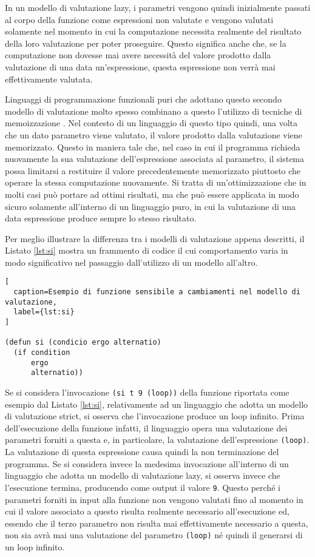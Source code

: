 In un modello di valutazione lazy, i parametri vengono quindi inizialmente
passati al corpo della funzione come espressioni non valutate e vengono valutati
solamente nel momento in cui la computazione necessita realmente del risultato
della loro valutazione per poter proseguire. Questo significa anche che, se la
computazione non dovesse mai avere necessità del valore prodotto dalla
valutazione di una data un'espressione, questa espressione non verrà mai
effettivamente valutata.

Linguaggi di programmazione funzionali puri che adottano questo secondo modello
di valutazione molto spesso combinano a questo l'utilizzo di tecniche di
memoizzazione \cite{Geyer-Schulz:1989:MEM:379209.379211}. Nel contesto di un
linguaggio di questo tipo quindi, una volta che un dato parametro viene
valutato, il valore prodotto dalla valutazione viene memorizzato. Questo in
maniera tale che, nel caso in cui il programma richieda nuovamente la sua
valutazione dell'espressione associata al parametro, il sistema possa limitarsi
a restituire il valore precedentemente memorizzato piuttosto che operare la
stessa computazione nuovamente. Si tratta di un'ottimizzazione che in molti casi
può portare ad ottimi risultati, ma che può essere applicata in modo sicuro
solamente all'interno di un linguaggio puro, in cui la valutazione di una data
espressione produce sempre lo stesso risultato.

Per meglio illustrare la differenza tra i modelli di valutazione appena
descritti, il Listato \ref{lst:si} mostra un frammento di codice il cui
comportamento varia in modo significativo nel passaggio dall'utilizzo di un
modello all'altro.

\begin{lstlisting}[
  caption=Esempio di funzione sensibile a cambiamenti nel modello di valutazione,
  label={lst:si}
]

(defun si (condicio ergo alternatio)
  (if condition
      ergo
      alternatio))

\end{lstlisting}

Se si considera l'invocazione \texttt{(si t 9 (loop))} della funzione riportata
come esempio dal Listato \ref{lst:si}, relativamente ad un linguaggio che adotta
un modello di valutazione strict, si osserva che l'invocazione produce un loop
infinito. Prima dell'esecuzione della funzione infatti, il linguaggio opera una
valutazione dei parametri forniti a questa e, in particolare, la valutazione
dell'espressione \texttt{(loop)}. La valutazione di questa espressione causa
quindi la non terminazione del programma. Se si considera invece la medesima
invocazione all'interno di un linguaggio che adotta un modello di valutazione
lazy, si osserva invece che l'esecuzione termina, producendo come output il
valore \texttt{9}. Questo perché i parametri forniti in input alla funzione non
vengono valutati fino al momento in cui il valore associato a questo risulta
realmente necessario all'esecuzione ed, essendo che il terzo parametro non
risulta mai effettivamente necessario a questa, non sia avrà mai una valutazione
del parametro \texttt{(loop)} né quindi il generarsi di un loop infinito.

